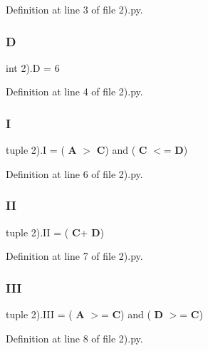 Definition at line 3 of file 2).\+py.

\mbox{\label{namespace2_08_ac32caaa142e8c501d2ebbdbd2d454cfd}} 
\subsubsection{D}
{\footnotesize\ttfamily int 2).D = 6}



Definition at line 4 of file 2).\+py.

\mbox{\label{namespace2_08_a24a6b2ecec86629b565c2e2d46453f32}} 
\subsubsection{I}
{\footnotesize\ttfamily tuple 2).I = (\textbf{ A} $>$ \textbf{ C}) and (\textbf{ C} $<$= \textbf{ D})}



Definition at line 6 of file 2).\+py.

\mbox{\label{namespace2_08_a0b9941a149e08264d74ce63fb1e8d119}} 
\subsubsection{II}
{\footnotesize\ttfamily tuple 2).II = (\textbf{ C}+\textbf{ D})}



Definition at line 7 of file 2).\+py.

\mbox{\label{namespace2_08_a57f3a6482670bab9411460382f018196}} 
\subsubsection{III}
{\footnotesize\ttfamily tuple 2).I\+II = (\textbf{ A} $>$= \textbf{ C}) and (\textbf{ D} $>$= \textbf{ C})}



Definition at line 8 of file 2).\+py.

